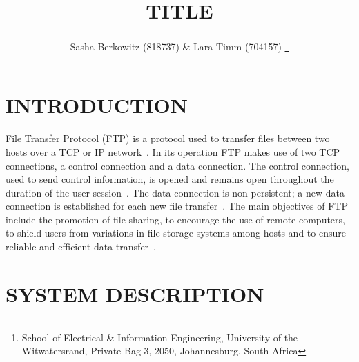 \documentclass[10pt,twocolumn]{witseiepaper}
\begin{document}
\title{TITLE}

\author{Sasha Berkowitz (818737) \& Lara Timm (704157)
\thanks{School of Electrical \& Information Engineering, University of the
Witwatersrand, Private Bag 3, 2050, Johannesburg, South Africa}
}


%
\abstract{}

\keywords{}

\maketitle
\pagestyle{plain}
\setcounter{page}{1}


\section{INTRODUCTION}

File Transfer Protocol (FTP) is a protocol used  to transfer files between two hosts over a TCP or IP network~\cite{FTPbeginners}. In its operation FTP makes use of two TCP connections, a control connection and a data connection. The control connection, used to send control information, is opened and remains open throughout the duration of the user session~\cite{topDownApproach6th}. The data connection is non-persistent; a new data connection is established for each new file transfer~\cite{topDownApproach6th}. The main objectives of FTP include the promotion of file sharing, to encourage the use of remote computers, to shield users from variations in file storage systems among hosts and to ensure reliable and efficient data transfer~\cite{rfc959}. 



\section{SYSTEM DESCRIPTION} 
\end{document}
